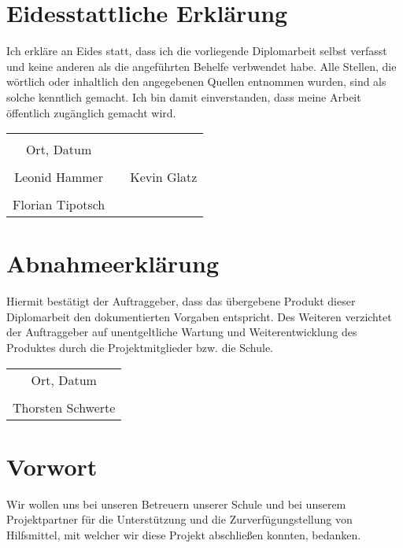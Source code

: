 \chapter*{Eidesstattliche Erklärung}
Ich erkläre an Eides statt, dass ich die vorliegende Diplomarbeit selbst verfasst und keine anderen als die angeführten Behelfe verbwendet habe. Alle Stellen, die wörtlich oder inhaltlich den angegebenen Quellen entnommen wurden, sind als solche kenntlich gemacht.
Ich bin damit einverstanden, dass meine Arbeit öffentlich zugänglich gemacht wird.

\vspace{1cm}
\begin{tabular}{c c c}
	& \hspace{4cm} & \\\cline{1-1}
	Ort, Datum & & \\
	\vspace{2cm}
	& & \\\cline{1-1}\cline{3-3}
	Leonid Hammer & & Kevin Glatz \\ 
	\vspace{2cm}
	& & \\\cline{1-1}
	 Florian Tipotsch
\end{tabular}

\chapter*{Abnahmeerklärung}
Hiermit bestätigt der Auftraggeber, dass das übergebene Produkt dieser Diplomarbeit den dokumentierten Vorgaben entspricht. Des Weiteren verzichtet der Auftraggeber auf unentgeltliche Wartung und Weiterentwicklung des Produktes durch die Projektmitglieder bzw. die Schule.

\vspace{1cm}
\begin{tabular}{c}
	\\\cline{1-1}
	Ort, Datum\\
	\vspace{2cm}
	\\\cline{1-1}
	Thorsten Schwerte
\end{tabular}	

\chapter*{Vorwort}
Wir wollen uns bei unseren Betreuern unserer Schule und bei unserem Projektpartner für die Unterstützung und die Zurverfügungstellung von Hilfsmittel, mit welcher wir diese Projekt abschließen konnten, bedanken.


